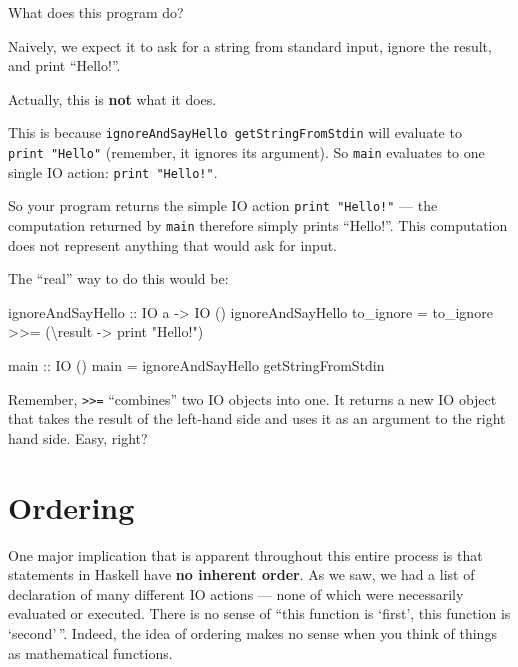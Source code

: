 \documentclass[]{article}
\newenvironment{Shaded}{}{}
\newcommand{\DataTypeTok}[1]{\textcolor[rgb]{0.56,0.13,0.00}{#1}}
\newcommand{\FunctionTok}[1]{\textcolor[rgb]{0.02,0.16,0.49}{#1}}
\newcommand{\NormalTok}[1]{#1}
\newcommand{\OperatorTok}[1]{\textcolor[rgb]{0.40,0.40,0.40}{#1}}
\newcommand{\OtherTok}[1]{\textcolor[rgb]{0.00,0.44,0.13}{#1}}
\newcommand{\StringTok}[1]{\textcolor[rgb]{0.25,0.44,0.63}{#1}}
\begin{document}
What does this program do?

Naively, we expect it to ask for a string from standard input, ignore the
result, and print ``Hello!''.

Actually, this is \textbf{not} what it does.

This is because \texttt{ignoreAndSayHello\ getStringFromStdin} will evaluate to
\texttt{print\ "Hello"} (remember, it ignores its argument). So \texttt{main}
evaluates to one single IO action: \texttt{print\ "Hello!"}.

So your program returns the simple IO action \texttt{print\ "Hello!"} --- the
computation returned by \texttt{main} therefore simply prints ``Hello!''. This
computation does not represent anything that would ask for input.

The ``real'' way to do this would be:

\begin{Shaded}
\begin{Highlighting}[]
\OtherTok{ignoreAndSayHello ::} \DataTypeTok{IO}\NormalTok{ a }\OtherTok{{-}\textgreater{}} \DataTypeTok{IO}\NormalTok{ ()}
\NormalTok{ignoreAndSayHello to\_ignore }\OtherTok{=}\NormalTok{ to\_ignore }\OperatorTok{\textgreater{}\textgreater{}=}\NormalTok{ (\textbackslash{}result }\OtherTok{{-}\textgreater{}} \FunctionTok{print} \StringTok{"Hello!"}\NormalTok{)}

\OtherTok{main ::} \DataTypeTok{IO}\NormalTok{ ()}
\NormalTok{main }\OtherTok{=}\NormalTok{ ignoreAndSayHello getStringFromStdin}
\end{Highlighting}
\end{Shaded}

Remember, \texttt{\textgreater{}\textgreater{}=} ``combines'' two IO objects
into one. It returns a new IO object that takes the result of the left-hand side
and uses it as an argument to the right hand side. Easy, right?

\section{Ordering}\label{ordering}

One major implication that is apparent throughout this entire process is that
statements in Haskell have \textbf{no inherent order}. As we saw, we had a list
of declaration of many different IO actions --- none of which were necessarily
evaluated or executed. There is no sense of ``this function is `first', this
function is `second'\,''. Indeed, the idea of ordering makes no sense when you
think of things as mathematical functions.
\end{document}
